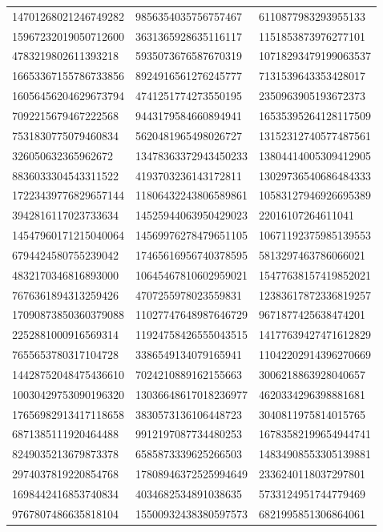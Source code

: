 \begin{longtable}{*{3}{l}}
14701268021246749282&9856354035756757467&6110877983293955133\\
15967232019050712600&3631365928635116117&1151853873976277101\\
4783219802611393218&5935073676587670319&10718293479199063537\\
16653367155786733856&8924916561276245777&7131539643353428017\\
16056456204629673794&4741251774273550195&2350963905193672373\\
7092215679467222568&9443179584660894941&16535395264128117509\\
7531830775079460834&5620481965498026727&13152312740577487561\\
326050632365962672&13478363372943450233&13804414005309412905\\
8836033304543311522&4193703236143172811&13029736540686484333\\
17223439776829657144&11806432243806589861&10583127946926695389\\
3942816117023733634&14525944063950429023&22016107264611041\\
14547960171215040064&14569976278479651105&10671192375985139553\\
6794424580755239042&17465616956740378595&5813297463786066021\\
4832170346816893000&10645467810602959021&15477638157419852021\\
7676361894313259426&4707255978023559831&12383617872336819257\\
17090873850360379088&11027747648987646729&9671877425638474201\\
2252881000916569314&11924758426555043515&14177639427471612829\\
7655653780317104728&3386549134079165941&11042202914396270669\\
14428752048475436610&7024210889162155663&3006218863928040657\\
10030429753090196320&13036648617018236977&4620334296398881681\\
17656982913417118658&3830573136106448723&3040811975814015765\\
6871385111920464488&9912197087734480253&16783582199654944741\\
8249035213679873378&6585873339625266503&14834908553305139881\\
2974037819220854768&17808946372525994649&2336240118037297801\\
1698442416853740834&4034682534891038635&5733124951744779469\\
9767807486635818104&15500932438380597573&6821995851306864061\\

\end{longtable}
